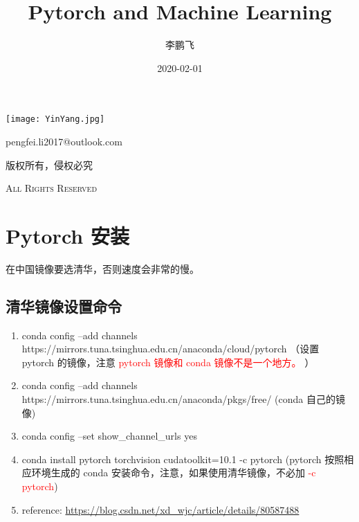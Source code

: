 \documentclass[UTF8,fancyhdr,a4paper]{ctexart}
\title{Pytorch and Machine Learning}
\author{李鹏飞}
\date{2020-02-01}
\begin{document}
\begin{titlepage}
\maketitle
{}
\centering
\vspace{10cm}
\texttt{[image: YinYang.jpg]}\par
\vspace{1cm}
{\huge pengfei.li2017@outlook.com}\par
\vspace{0.5cm}
{\small 版权所有，侵权必究}\par
\vspace{0.5cm}
{\scshape \small All Rights Reserved}
\end{titlepage}

\tableofcontents
{}%
\clearpage
\listoffigures
{}
\clearpage
\listoftables
{}
\clearpage

\newpage
{}
\section{Pytorch 安装}
在中国镜像要选清华，否则速度会非常的慢。
\subsection{清华镜像设置命令}
\begin{enumerate}
\item conda config --add channels https://mirrors.tuna.tsinghua.edu.cn/anaconda/cloud/pytorch （设置 pytorch 的镜像，注意 \textcolor{red}{pytorch 镜像和 conda 镜像不是一个地方。} ）
\item conda config --add channels https://mirrors.tuna.tsinghua.edu.cn/anaconda/pkgs/free/ (conda 自己的镜像)
\item conda config --set show\_channel\_urls yes
\item conda install pytorch torchvision cudatoolkit=10.1 -c pytorch (pytorch 按照相应环境生成的 conda 安装命令，注意，如果使用清华镜像，不必加 \textcolor{red}{-c pytorch})
\item reference: \url{https://blog.csdn.net/xd_wjc/article/details/80587488}

\end{enumerate}
\end{document}
